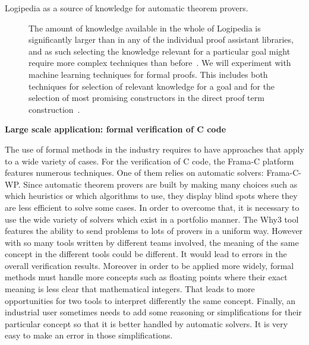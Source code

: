 \begin{description}
\item[Logipedia as a source of knowledge for automatic theorem provers.]
The amount of knowledge available in the whole of Logipedia is
  significantly larger than in any of the individual proof assistant
  libraries, and as such selecting the knowledge relevant for a
  particular goal might require more complex techniques than
  before~\cite{Irving-deepmath}.
We will experiment with machine learning techniques for formal
  proofs. This includes both techniques for selection of relevant
  knowledge for a goal and for the selection of most promising
  constructors in the direct proof term
  construction~\cite{ZielenkiewiczSchubert2016}.
\end{description}


\noindent
{\bf \large Large scale application: formal verification of C code}

The use of formal methods in the industry requires to have approaches
that apply to a wide variety of cases. For the verification of C code,
the Frama-C platform features numerous techniques. One of them relies on
automatic solvers: Frama-C-WP. Since automatic theorem provers are built by making many
choices such as which heuristics or which algorithms to use, they
display blind spots where they are less efficient to solve some cases.
In order to overcome that, it is necessary to use the wide variety of
solvers which exist in a portfolio manner. The Why3 tool features the
ability to send problems to lots of provers in a uniform way. However
with so many tools written by different teams involved, the meaning of
the same concept in the different tools could be different. It would
lead to errors in the overall verification results. Moreover in order to
be applied more widely, formal methods must handle more concepts such as
floating points where their exact meaning is less clear that
mathematical integers. That leads to more opportunities for two tools to
interpret differently the same concept. Finally, an industrial user
sometimes needs to add some reasoning or simplifications for their
particular concept so that it is better handled by automatic solvers. It
is very easy to make an error in those simplifications.

